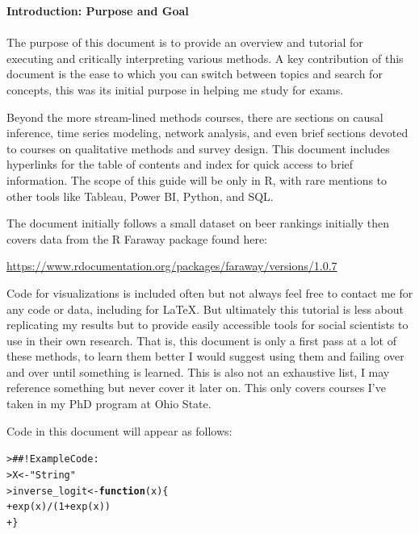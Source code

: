 \documentclass[12pt]{article}\usepackage[]{graphicx}\usepackage[]{color}
\date{\today} %
\makeatletter
\newcommand{\hlnum}[1]{\textcolor[rgb]{0.82,0.78,0.62}{#1}}%
\newcommand{\hlstr}[1]{\textcolor[rgb]{0.82,0.78,0.62}{#1}}%
\newcommand{\hlcom}[1]{\textcolor[rgb]{0.404,0.408,0.42}{#1}}%
\newcommand{\hlopt}[1]{\textcolor[rgb]{0.882,0.878,0.898}{#1}}%
\newcommand{\hlstd}[1]{\textcolor[rgb]{0.882,0.878,0.898}{#1}}%
\newcommand{\hlkwa}[1]{\textcolor[rgb]{0.384,0.675,0.808}{\textbf{#1}}}%
\newcommand{\hlkwb}[1]{\textcolor[rgb]{0.902,0.675,0.196}{#1}}%
\newcommand{\hlkwc}[1]{\textcolor[rgb]{0.812,0.522,0.388}{#1}}%
\newcommand{\hlkwd}[1]{\textcolor[rgb]{0.733,0.388,0.812}{#1}}%
\newenvironment{kframe}{%
 \def\at@end@of@kframe{}%
 \ifinner\ifhmode%
  \def\at@end@of@kframe{\end{minipage}}%
  \begin{minipage}{\columnwidth}%
 \fi\fi%
 \def\FrameCommand##1{\hskip\@totalleftmargin \hskip-\fboxsep
 \colorbox{shadecolor}{##1}\hskip-\fboxsep
     \hskip-\linewidth \hskip-\@totalleftmargin \hskip\columnwidth}%
 \MakeFramed {\advance\hsize-\width
   \@totalleftmargin\z@ \linewidth\hsize
   \@setminipage}}%
 {\par\unskip\endMakeFramed%
 \at@end@of@kframe}
\newenvironment{knitrout}{}{} %
\makeatother
\begin{document}
\begin{flushleft}
\setlength{\parindent}{1cm} %



\thispagestyle{empty}
\noindent \textbf{Introduction: Purpose and Goal}\\
\hfill \\
The purpose of this document is to provide an overview and tutorial for executing and critically interpreting various methods. A key contribution of this document is the ease to which you can switch between topics and search for concepts, this was its initial purpose in helping me study for exams.

Beyond the more stream-lined methods courses, there are sections on causal inference, time series modeling, network analysis, and even brief sections devoted to courses on qualitative methods and survey design. This document includes hyperlinks for the table of contents and index for quick access to brief information. The scope of this guide will be only in R, with rare mentions to other tools like Tableau, Power BI, Python, and SQL.

The document initially follows a small dataset on beer rankings initially then covers data from the R Faraway package found here:

\begin{center}
\url{https://www.rdocumentation.org/packages/faraway/versions/1.0.7}
\end{center}

Code for visualizations is included often but not always feel free to contact me for any code or data, including for \LaTeX. But ultimately this tutorial is less about replicating my results but to provide easily accessible tools for social scientists to use in their own research. That is, this document is only a first pass at a lot of these methods, to learn them better I would suggest using them and failing over and over until something is learned. This is also not an exhaustive list, I may reference something but never cover it later on. This only covers courses I've taken in my PhD program at Ohio State.

Code in this document will appear as follows:




\begin{knitrout}
\color{fgcolor}\begin{kframe}
\begin{alltt}
\hlstd{> }\hlcom{##!  Example Code:}
\hlstd{> }\hlstd{X} \hlkwb{<-} \hlstr{"String"}
\hlstd{> }\hlstd{inverse_logit} \hlkwb{<-} \hlkwa{function}\hlstd{(}\hlkwc{x}\hlstd{)\{}
\hlstd{+ }     \hlkwd{exp}\hlstd{(x)}\hlopt{/}\hlstd{(}\hlnum{1}\hlopt{+}\hlkwd{exp}\hlstd{(x))}
\hlstd{+ }\hlstd{\}}
\end{alltt}
\end{kframe}
\end{knitrout}



\end{flushleft}
\end{document}
